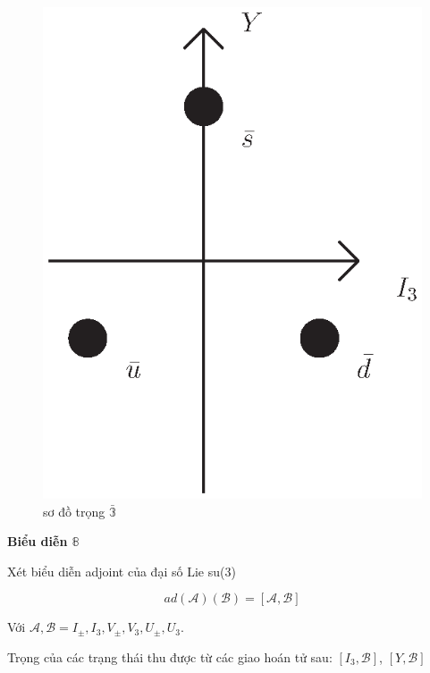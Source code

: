 \documentclass{report}
\begin{document}
	\begin{figure}[!htb]
		\centering
		\includegraphics[scale=0.5]{diagram3.eps}
		\caption{sơ đồ trọng \( \bar{\mathbb{3}} \)}
	\end{figure}

\textbf{Biểu diễn \( \mathbb{8} \)}

Xét biểu diễn adjoint của đại số Lie su(3)

	\[ ad \left( \mathcal{A} \right) \left( \mathcal{B} \right) = \left[ \mathcal{A}, \mathcal{B} \right] \] 
	
Với \( \mathcal{A}, \mathcal{B} = I_{\pm}, I_{3}, V_{\pm}, V_{3}, U_{\pm}, U_{3} \).

Trọng của các trạng thái thu được từ các giao hoán tử sau: \( \left[ I_{3}, \mathcal{B} \right] \), \( \left[ Y, \mathcal{B} \right] \)
\end{document}
